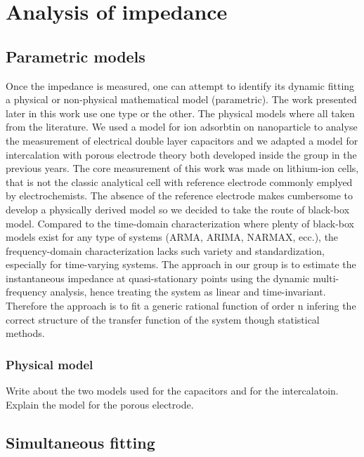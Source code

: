\chapter{Analysis of impedance}
\minitoc

\section{Parametric models}
Once the impedance is measured, one can attempt to identify its dynamic fitting a physical or non-physical mathematical model (parametric). The work presented later in this work use one type or the other. The physical models where all taken from the literature. We used a model for ion adsorbtin on nanoparticle to analyse the measurement of electrical double layer capacitors and we adapted a model for intercalation with porous electrode theory both developed inside the group in the previous years. The core measurement of this work was made on lithium-ion cells, that is not the classic analytical cell with reference electrode commonly emplyed by electrochemists. The absence of the reference electrode makes cumbersome to develop a physically derived model so we decided to take the route of black-box model. Compared to the time-domain characterization where plenty of black-box models exist for any type of systems (ARMA, ARIMA, NARMAX, ecc.), the frequency-domain characterization lacks such variety and standardization, especially for time-varying systems. The approach in our group is to estimate the instantaneous impedance at quasi-stationary points using the dynamic multi-frequency analysis, hence treating the system as linear and time-invariant. Therefore the approach is to fit a generic rational function of order n infering the correct structure of the transfer function of the system though statistical methods. 

\subsection{Physical model}

Write about the two models used for the capacitors and for the intercalatoin. Explain the model for the porous electrode.

\section{Simultaneous fitting}

